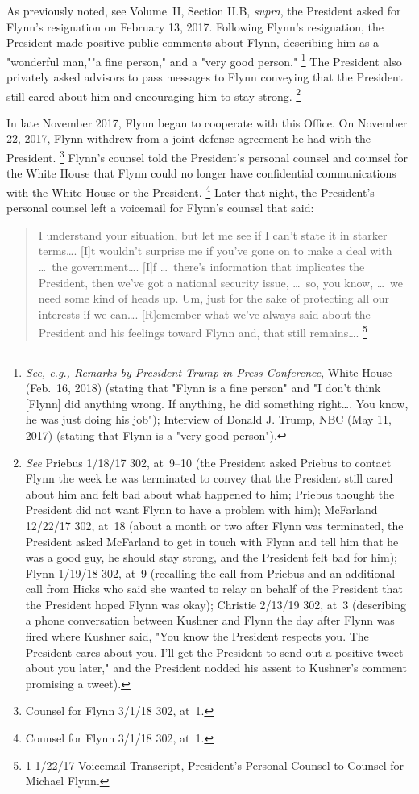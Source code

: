 {As previously noted, see Volume~II, Section II.B, \textit{supra}, the President asked for Flynn's resignation on February 13, 2017.
Following Flynn's resignation, the President made positive public comments about Flynn, describing him as a "wonderful man,""a fine person," and a "very good person."%
\footnote{\textit{See, e.g., Remarks by President Trump in Press Conference}, White House (Feb.~16, 2018) (stating that "Flynn is a fine person" and "I don't think [Flynn] did anything wrong.
If anything, he did something right\dots. You know, he was just doing his job");
Interview of Donald J. Trump, NBC (May 11, 2017) (stating that Flynn is a "very good person").}
The President also privately asked advisors to pass messages to Flynn conveying that the President still cared about him and encouraging him to stay strong.%
\footnote{\textit{See} Priebus 1/18/17 302, at~9--10 (the President asked Priebus to contact Flynn the week he was terminated to convey that the President still cared about him and felt bad about what happened to him;
Priebus thought the President did not want Flynn to have a problem with him);
McFarland 12/22/17 302, at~18 (about a month or two after Flynn was terminated, the President asked McFarland to get in touch with Flynn and tell him that he was a good guy, he should stay strong, and the President felt bad for him);
Flynn 1/19/18 302, at~9 (recalling the call from Priebus and an additional call from Hicks who said she wanted to relay on behalf of the President that the President hoped Flynn was okay);
Christie 2/13/19 302, at~3 (describing a phone conversation between Kushner and Flynn the day after Flynn was fired where Kushner said, "You know the President respects you.
The President cares about you.
I'll get the President to send out a positive tweet about you later," and the President nodded his assent to Kushner's comment promising a tweet).}

In late November 2017, Flynn began to cooperate with this Office.
On November 22, 2017, Flynn withdrew from a joint defense agreement he had with the President.%
\footnote{Counsel for Flynn 3/1/18 302, at~1.}
Flynn's counsel told the President's personal counsel and counsel for the White House that Flynn could no longer have confidential communications with the White House or the President.%
\footnote{Counsel for Flynn 3/1/18 302, at~1.}
Later that night, the President's personal counsel left a voicemail for Flynn's counsel that said:

\begin{quote}
I understand your situation, but let me see if I can't state it in starker terms\dots.
[I]t wouldn't surprise me if you've gone on to make a deal with \dots\ the government\dots.
[I]f \dots\ there's information that implicates the President, then we've got a national security issue, \dots\ so, you know, \dots\ we need some kind of heads up.
Um, just for the sake of protecting all our interests if we can\dots.
[R]emember what we've always said about the President and his feelings toward Flynn and, that still remains\dots.%
\footnote{1 1/22/17 Voicemail Transcript, President's Personal Counsel to Counsel for Michael Flynn.}
\end{quote}

}
